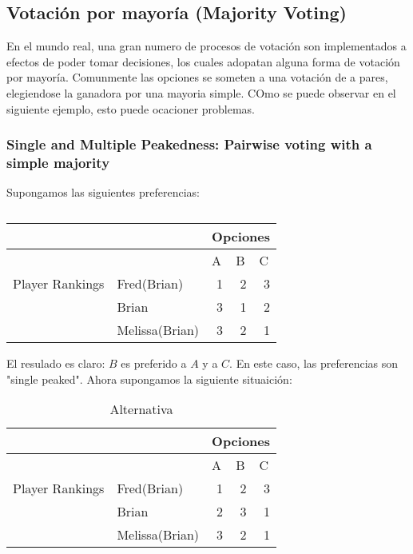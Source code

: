 \subsection{Votación por mayoría (Majority Voting)}
En el mundo real, una gran numero de procesos de votación son implementados a efectos de poder tomar decisiones, los cuales adopatan alguna forma de votación por mayoría. Comunmente las opciones se someten a una votación de a pares, elegiendose la ganadora por una mayoria simple. COmo se puede observar en el siguiente ejemplo, esto puede ocacioner problemas.
\subsubsection{Single and Multiple Peakedness: Pairwise voting with a simple
majority}
Supongamos las siguientes preferencias:
 
\begin{table}[htbp]
\caption{}
\begin{tabular}{|l|l|r|r|r|}
\hline
 &  & \multicolumn{ 3}{c|}{Opciones} \\ \hline
 &  & \multicolumn{1}{l|}{A} & \multicolumn{1}{l|}{B} & \multicolumn{1}{l|}{C} \\ \hline
\multicolumn{ 1}{|c|}{Player Rankings} & Fred(Brian) & 1 & 2 & 3 \\ \cline{ 2- 5}
\multicolumn{ 1}{|l|}{} & Brian & 3 & 1 & 2 \\ \cline{ 2- 5}
\multicolumn{ 1}{|l|}{} & Melissa(Brian) & 3 & 2 & 1 \\ \hline
\end{tabular}
\label{}
\end{table}

 
El resulado es claro: $B$ es preferido a $A$ y a $C$. En este caso, las preferencias son "single peaked".
Ahora supongamos la siguiente situaición:
 
\begin{table}[htbp]
\caption{Alternativa}
\begin{tabular}{|l|l|r|r|r|}
\hline
 &  & \multicolumn{ 3}{c|}{Opciones} \\ \hline
 &  & \multicolumn{1}{l|}{A} & \multicolumn{1}{l|}{B} & \multicolumn{1}{l|}{C} \\ \hline
\multicolumn{ }{|c|}{Player Rankings} & Fred(Brian) & 1 & 2 & 3 \\ \cline{ 2- 5}
\multicolumn{ }{|l|}{} & Brian & 2 & 3 & 1 \\ \cline{ 2- 5}
\multicolumn{ }{|l|}{} & Melissa(Brian) & 3 & 2 & 1 \\ \hline
\end{tabular}
\label{}
\end{table}


